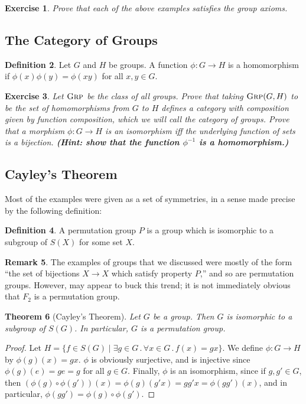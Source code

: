 \documentclass[11pt]{article}
\theoremstyle{plain}
\newtheorem{thm}{Theorem}[subsection]
\newtheorem{exrc}[thm]{Exercise}
\theoremstyle{definition}
\newtheorem{defn}[thm]{Definition}
\newtheorem{remk}[thm]{Remark}
\newcommand{\Grp}{{\textsc{Grp}}}
\begin{document}
\begin{exrc}
    Prove that each of the above examples satisfies the group axioms.
\end{exrc}

\subsection{The Category of Groups}

\begin{defn}
    Let $G$ and $H$ be groups. A function $\phi : G \to H$ is a homomorphism if $\phi(x)\phi(y) = \phi(xy)$ for all $x,y \in G$.
\end{defn}

\begin{exrc}
    Let $\Grp$ be the class of all groups. Prove that taking $\Grp(G,H)$ to be the set of homomorphisms from $G$ to $H$ defines a category with composition given by function composition, which we will call the category of groups. Prove that a morphism $\phi : G \to H$ is an isomorphism iff the underlying function of sets is a bijection. \textbf{(Hint: show that the function $\phi^{-1}$ is a homomorphism.)}
\end{exrc}

\subsection{Cayley's Theorem}

Most of the examples were given as a set of symmetries, in a sense made precise by the following definition:

\begin{defn}
    A permutation group $P$ is a group which is isomorphic to a subgroup of $S(X)$ for some set $X$.
\end{defn}


\begin{remk}
    The examples of groups that we discussed were mostly of the form ``the set of bijections $X \to X$ which satisfy property $P$,'' and so are permutation groups. However,  may appear to buck this trend; it is not immediately obvious that $F_2$ is a permutation group.
\end{remk}

\begin{thm}[Cayley's Theorem]
    Let $G$ be a group. Then $G$ is isomorphic to a subgroup of $S(G)$. In particular, $G$ is a permutation group.
\end{thm}
\begin{proof}
    Let $H = \{f \in S(G) \mid \exists g \in G \, . \, \forall x \in G \,.\, f(x) = gx\}$. We define $\phi : G \to H$ by $\phi(g)(x) = gx$. $\phi$ is obviously surjective, and is injective since $\phi(g)(e) = ge = g$ for all $g \in G$. Finally, $\phi$ is an isomorphism, since if $g,g' \in G$, then $(\phi(g) \circ \phi(g'))(x) = \phi(g)(g'x) = gg'x = \phi(gg')(x)$, and in particular, $\phi(gg') = \phi(g) \circ \phi(g')$.
\end{proof}
\end{document}
